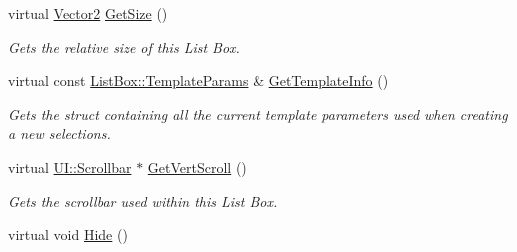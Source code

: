 \begin{DoxyCompactItemize}
virtual \hyperlink{classphys_1_1Vector2}{Vector2} \hyperlink{classphys_1_1UI_1_1ListBox_a7af2cced185d63be6a62d5122c700d81}{GetSize} ()
\begin{DoxyCompactList}\small\item\em Gets the relative size of this List Box. \item\end{DoxyCompactList}\item 
virtual const \hyperlink{structphys_1_1UI_1_1ListBox_1_1TemplateParams}{ListBox::TemplateParams} \& \hyperlink{classphys_1_1UI_1_1ListBox_a138619898628207d48adfe2bb08536d8}{GetTemplateInfo} ()
\begin{DoxyCompactList}\small\item\em Gets the struct containing all the current template parameters used when creating a new selections. \item\end{DoxyCompactList}\item 
virtual \hyperlink{classphys_1_1UI_1_1Scrollbar}{UI::Scrollbar} $\ast$ \hyperlink{classphys_1_1UI_1_1ListBox_a9f62475c3a81772407af38076363060e}{GetVertScroll} ()
\begin{DoxyCompactList}\small\item\em Gets the scrollbar used within this List Box. \item\end{DoxyCompactList}\item 
\hypertarget{classphys_1_1UI_1_1ListBox_a896220f2423ce6295ea3c8dc3a10d4b8}{
virtual void \hyperlink{classphys_1_1UI_1_1ListBox_a896220f2423ce6295ea3c8dc3a10d4b8}{Hide} ()}
\label{classphys_1_1UI_1_1ListBox_a896220f2423ce6295ea3c8dc3a10d4b8}


\end{DoxyCompactItemize}
